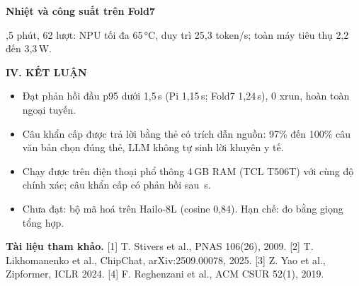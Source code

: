 \documentclass{article}
\newcommand{\phu}[1]{{\fontsize{22}{26}\selectfont\bfseries\color{dam}#1}\par\vspace{3pt}}
\newcommand{\muc}[1]{{\fontsize{27}{31}\selectfont\bfseries\color{dam}#1}\par\vspace{-4pt}{\color{doute}\rule{42mm}{1.4mm}}\par\vspace{5pt}}
\begin{document}
\begin{minipage}[t][\textheight][t]{\textwidth}
\begin{cotk}{\rong}{\cao}
\phu{Nhiệt và công suất trên Fold7}
{\fontsize{16.5}{20},5 phút, 62 lượt: NPU tối đa 65\,°C, duy trì 25,3 token/s; toàn máy tiêu thụ 2,2 đến 3,3\,W.\par}
\vspace{5pt}
\muc{IV. KẾT LUẬN}
{\fontsize{17.5}{21.5}\selectfont
\begin{itemize}[itemsep=2pt]
\item Đạt phản hồi đầu p95 dưới 1,5\,s (Pi 1,15\,s; Fold7 1,24\,s), 0 xrun, hoàn toàn ngoại tuyến.
\item Câu khẩn cấp được trả lời bằng thẻ có trích dẫn nguồn: 97\% đến 100\% câu văn bản chọn đúng thẻ, LLM không tự sinh lời khuyên y tế.
\item Chạy được trên điện thoại phổ thông 4\,GB RAM (TCL T506T) với cùng độ chính xác; câu khẩn cấp có phản hồi sau \tclSafeMed\,s.
\item Chưa đạt: bộ mã hoá trên Hailo-8L (cosine 0,84). Hạn chế: đo bằng giọng tổng hợp.
\end{itemize}\par}
\vspace{3pt}
{\fontsize{12.5}{15}\selectfont\color{black!75}\textbf{Tài liệu tham khảo.} [1] T. Stivers et al., PNAS 106(26), 2009. [2] T. Likhomanenko et al., ChipChat, arXiv:2509.00078, 2025. [3] Z. Yao et al., Zipformer, ICLR 2024. [4] F. Reghenzani et al., ACM CSUR 52(1), 2019.\par}
\end{cotk}
\end{minipage}
\end{document}

